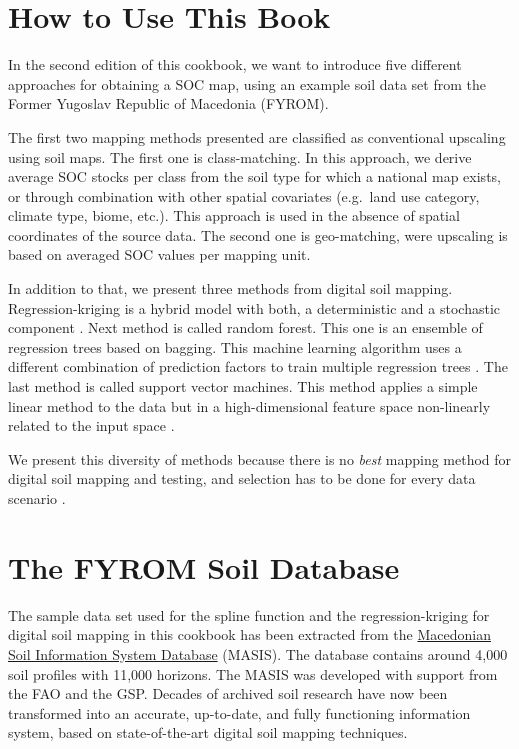\documentclass[10pt,b5paper,]{book}
\theoremstyle{definition}
\theoremstyle{definition}
\theoremstyle{definition}
\theoremstyle{remark}
\begin{document}
\hypertarget{how-to-use-this-book}{%
\section{How to Use This Book}\label{how-to-use-this-book}}

In the second edition of this cookbook, we want to introduce five
different approaches for obtaining a SOC map, using an example soil data
set from the Former Yugoslav Republic of Macedonia (FYROM).

The first two mapping methods presented are classified as conventional
upscaling using soil maps. The first one is class-matching. In this
approach, we derive average SOC stocks per class from the soil type for
which a national map exists, or through combination with other spatial
covariates (e.g.~land use category, climate type, biome, etc.). This
approach is used in the absence of spatial coordinates of the source
data. The second one is geo-matching, were upscaling is based on
averaged SOC values per mapping unit.

In addition to that, we present three methods from digital soil mapping.
Regression-kriging is a hybrid model with both, a deterministic and a
stochastic component \citep{hengl2007regression}. Next method is called
random forest. This one is an ensemble of regression trees based on
bagging. This machine learning algorithm uses a different combination of
prediction factors to train multiple regression trees
\citep{Breiman1996}. The last method is called support vector machines.
This method applies a simple linear method to the data but in a
high-dimensional feature space non-linearly related to the input space
\citep{Karatzoglou2006}.

We present this diversity of methods because there is no \emph{best}
mapping method for digital soil mapping and testing, and selection has
to be done for every data scenario \citep{soil-2017-40}.

\hypertarget{the-fyrom-soil-database}{%
\section{The FYROM Soil Database}\label{the-fyrom-soil-database}}

The sample data set used for the spline function and the
regression-kriging for digital soil mapping in this cookbook has been
extracted from the \href{http://www.maksoil.ukim.mk/}{Macedonian Soil
Information System Database} (MASIS). The database contains around 4,000
soil profiles with 11,000 horizons. The MASIS was developed with support
from the FAO and the GSP. Decades of archived soil research have now
been transformed into an accurate, up-to-date, and fully functioning
information system, based on state-of-the-art digital soil mapping
techniques.
\end{document}

